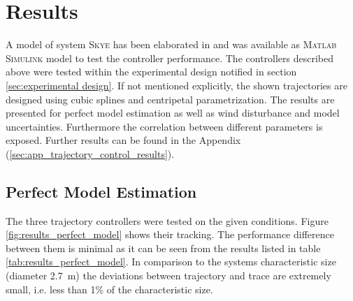 \section{Results}
\label{sec:results}

A model of system \textsc{Skye} has been elaborated in \cite{weichart} and was available as \textsc{Matlab Simulink} model to test the controller performance. The controllers described above were tested within the experimental design notified in section \ref{sec:experimental design}. If not mentioned explicitly, the shown trajectories are designed using cubic splines and centripetal parametrization. The results are presented for perfect model estimation as well as wind disturbance and model uncertainties. Furthermore the correlation between different parameters is exposed. Further results can be found in the Appendix (\ref{sec:app_trajectory_control_results}).

\subsection{Perfect Model Estimation}
\label{sub:results_perfect_model}

The three trajectory controllers were tested on the given conditions. Figure \ref{fig:results_perfect_model} shows their tracking. The performance difference between them is minimal as it can be seen from the results listed in table \ref{tab:results_perfect_model}. In comparison to the systems characteristic size (diameter \SI{2.7}{\meter}) the deviations between trajectory and trace are extremely small, i.e. less than 1\% of the characteristic size. 

